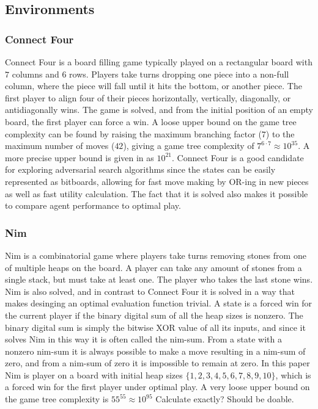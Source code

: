 \subsection{Environments}

\subsubsection{Connect Four}
Connect Four is a board filling game typically played on a rectangular board with $7$ columns and $6$ rows. Players take turns dropping one piece into a non-full column, where the piece will fall until it hits the bottom, or another piece. The first player to align four of their pieces horizontally, vertically, diagonally, or antidiagonally wins. The game is solved, and from the initial position of an empty board, the first player can force a win. A loose upper bound on the game tree complexity can be found by raising the maximum branching factor ($7$) to the maximum number of moves ($42$), giving a game tree complexity of $7^{6 \cdot 7} \approx 10^{35}$. A more precise upper bound is given in \needcit as $10^{21}$. Connect Four is a good candidate for exploring adversarial search algorithms since the states can be easily represented as bitboards, allowing for fast move making by OR-ing in new pieces as well as fast utility calculation. The fact that it is solved also makes it possible to compare agent performance to optimal play.

\subsubsection{Nim}
Nim is a combinatorial game where players take turns removing stones from one of multiple heaps on the board. A player can take any amount of stones from a single stack, but must take at least one. The player who takes the last stone wins. Nim is also solved, and in contrast to Connect Four it is solved in a way that makes desinging an optimal evaluation function trivial. A state is a forced win for the current player if the binary digital sum of all the heap sizes is nonzero. The binary digital sum is simply the bitwise XOR value of all its inputs, and since it solves Nim in this way it is often called the nim-sum. From a state with a nonzero nim-sum it is always possible to make a move resulting in a nim-sum of zero, and from a nim-sum of zero it is impossible to remain at zero. In this paper Nim is player on a board with initial heap sizes $\{1, 2, 3, 4, 5, 6, 7, 8, 9, 10\}$, which is a forced win for the first player under optimal play. A very loose upper bound on the game tree complexity is $55^{55} \approx 10^{95}$ \revise Calculate exactly? Should be doable.

